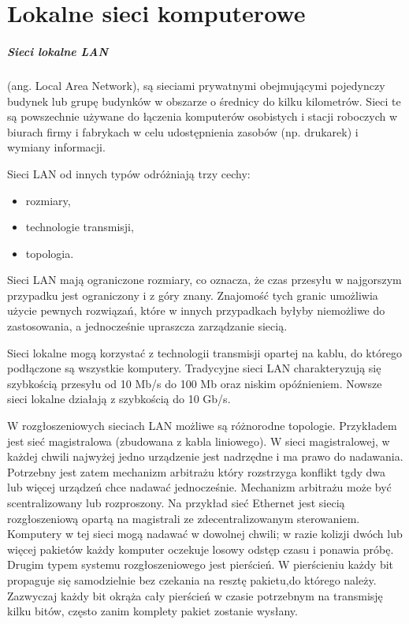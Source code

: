 \documentclass[]{report}
\begin{document}
\chapter{Lokalne sieci komputerowe}
\paragraph{Sieci lokalne LAN} (ang. Local Area Network), są sieciami prywatnymi obejmującymi pojedynczy budynek lub grupę budynków w obszarze o średnicy do kilku kilometrów. Sieci te są powszechnie używane do łączenia komputerów osobistych i stacji roboczych w biurach firmy i fabrykach w celu udostępnienia zasobów (np. drukarek) i wymiany informacji. 

Sieci LAN od innych typów odróżniają trzy cechy:
\begin{itemize}
\item rozmiary,
\item technologie transmisji,
\item topologia.
\end{itemize}

Sieci LAN mają ograniczone rozmiary, co oznacza, że czas przesyłu w najgorszym przypadku jest ograniczony i z góry znany. Znajomość tych granic umożliwia użycie pewnych rozwiązań, które w innych przypadkach byłyby niemożliwe do zastosowania, a jednocześnie upraszcza zarządzanie siecią.


Sieci lokalne mogą korzystać z technologii transmisji opartej na kablu, do którego podłączone są wszystkie komputery. Tradycyjne sieci LAN charakteryzują się szybkością przesyłu od 10 Mb/s do 100 Mb oraz niskim opóźnieniem. Nowsze sieci lokalne działają z szybkością do 10 Gb/s. 

W rozgłoszeniowych sieciach LAN możliwe są różnorodne topologie. Przykładem jest sieć magistralowa (zbudowana z kabla liniowego). W sieci magistralowej, w każdej chwili najwyżej jedno urządzenie jest nadrzędne i ma prawo do nadawania. Potrzebny jest zatem mechanizm arbitrażu który rozstrzyga konflikt tgdy dwa lub więcej urządzeń chce nadawać jednocześnie. Mechanizm arbitrażu może być scentralizowany lub rozproszony. Na przykład sieć Ethernet jest siecią rozgłoszeniową opartą na magistrali ze zdecentralizowanym sterowaniem. Komputery w tej sieci mogą nadawać w dowolnej chwili; w razie kolizji dwóch lub więcej pakietów każdy komputer oczekuje losowy odstęp czasu i ponawia próbę. Drugim typem systemu rozgłoszeniowego jest pierścień. W pierścieniu każdy bit propaguje się samodzielnie bez czekania na resztę pakietu,do którego należy. Zazwyczaj każdy bit okrąża cały pierścień w czasie potrzebnym na transmisję kilku bitów, często zanim komplety pakiet zostanie wysłany.
\end{document}
